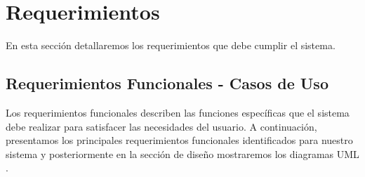 \section{Requerimientos}
En esta sección detallaremos los requerimientos que debe cumplir el sistema.

\subsection{Requerimientos Funcionales - Casos de Uso}
Los requerimientos funcionales describen las funciones específicas que el sistema debe realizar para satisfacer las necesidades del usuario. 
A continuación, presentamos los principales requerimientos funcionales identificados para nuestro sistema y posteriormente en la sección de diseño
mostraremos los diagramas UML \cite{RequisitosFuncionales}.

